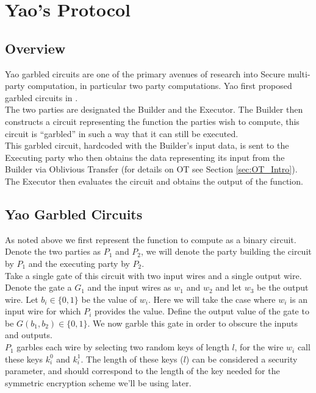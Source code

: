 \documentclass[ %
                    author={Nicholas Tutte},
                supervisor={Prof. Nigel Smart},
                    degree={MEng},
                     title={Secure Two Party Computation},
                  subtitle={A practical comparison of recent protocols},
                      type={Research - GG1K},
                      year={2015} ]{dissertation}
\begin{document}
	\section{Yao's Protocol} \label{sec:Yao_Circuits}

		\subsection{Overview} \label{sub:Yao_Overview}
			Yao garbled circuits are one of the primary avenues of research into Secure multi-party computation, in particular two party computations. Yao first proposed garbled circuits in \cite{YaoOriginal}.\\

			The two parties are designated the Builder and the Executor. The Builder then constructs a circuit representing the function the parties wish to compute, this circuit is ``garbled'' in such a way that it can still be executed.\\

			This garbled circuit, hardcoded with the Builder's input data, is sent to the Executing party who then obtains the data representing its input from the Builder via Oblivious Transfer (for details on OT see Section  \ref{sec:OT_Intro}). The Executor then evaluates the circuit and obtains the output of the function.


		\subsection{Yao Garbled Circuits} \label{sub:Yao_Details}
			As noted above we first represent the function to compute as a binary circuit. Denote the two parties as $P_1$ and $P_2$, we will denote the party building the circuit by $P_1$ and the executing party by $P_2$.\\
			
			Take a single gate of this circuit with two input wires and a single output wire. Denote the gate a $G_1$ and the input wires as $w_1$ and $w_2$ and let $w_3$ be the output wire. Let $b_i \in \{0, 1\}$ be the value of $w_i$. Here we will take the case where $w_i$ is an input wire for which $P_i$ provides the value. Define the output value of the gate to be $G(b_1, b_2) \in \{0, 1\}$. We now garble this gate in order to obscure the inputs and outputs.\\

			$P_1$ garbles each wire by selecting two random keys of length $l$, for the wire $w_i$ call these keys $k_i^0$ and $k_i^1$. The length of these keys ($l$) can be considered a security parameter, and should correspond to the length of the key needed for the symmetric encryption scheme we'll be using later.\\
\end{document}
